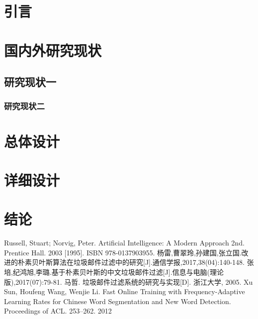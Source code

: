 \documentclass[UTF8,zihao=-4]{ctexart}
\begin{document}
\section{引言}
\zhlipsum*[2]

\section{国内外研究现状}

\subsection{研究现状一}
\zhlipsum*[3]

\subsubsection{研究现状二}
\zhlipsum*[3]

\section{总体设计}
\zhlipsum*[4]

\section{详细设计}
\zhlipsum*[5]

\section{结论}
\zhlipsum*[6]


\begin{thebibliography}{99}
  \linespread{1.25}\songti{}
  Russell, Stuart; Norvig, Peter. Artificial Intelligence: A Modern Approach 2nd. Prentice Hall. 2003 [1995]. ISBN 978-0137903955.
  杨雷,曹翠玲,孙建国,张立国.改进的朴素贝叶斯算法在垃圾邮件过滤中的研究[J].通信学报,2017,38(04):140-148.
  张培,纪鸿旭,李璐.基于朴素贝叶斯的中文垃圾邮件过滤[J].信息与电脑(理论版),2017(07):79-81.
  马哲. 垃圾邮件过滤系统的研究与实现[D]. 浙江大学, 2005.
  Xu Sun, Houfeng Wang, Wenjie Li. Fast Online Training with Frequency-Adaptive Learning Rates for Chinese Word Segmentation and New Word Detection. Proceedings of ACL. 253–262. 2012
\end{thebibliography}
\end{document}
